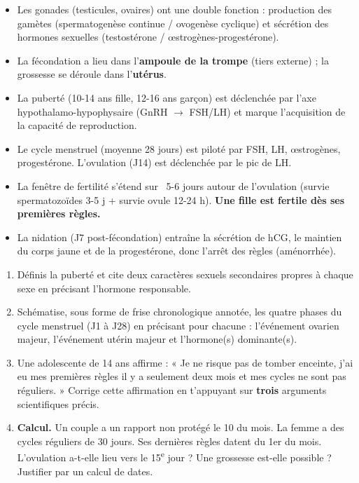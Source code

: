 \documentclass[11pt]{article}
\newcommand{\cle}[1]{{\popxbold\color{popdark}#1}}
\begin{document}
\begin{aretenir}
\begin{itemize}
\item Les \cle{gonades} (testicules, ovaires) ont une double fonction : production des gamètes (spermatogenèse continue / ovogenèse cyclique) et sécrétion des hormones sexuelles (testostérone / œstrogènes-progestérone).
\item La \cle{fécondation} a lieu dans l'\textbf{ampoule de la trompe} (tiers externe) ; la grossesse se déroule dans l'\textbf{utérus}.
\item La \cle{puberté} (10-14 ans fille, 12-16 ans garçon) est déclenchée par l'axe hypothalamo-hypophysaire (GnRH $\to$ FSH/LH) et marque l'acquisition de la capacité de reproduction.
\item Le \cle{cycle menstruel} (moyenne 28 jours) est piloté par FSH, LH, œstrogènes, progestérone. L'ovulation (J14) est déclenchée par le pic de LH.
\item La \cle{fenêtre de fertilité} s'étend sur ~5-6 jours autour de l'ovulation (survie spermatozoïdes 3-5 j + survie ovule 12-24 h). \textbf{Une fille est fertile dès ses premières règles.}
\item La \cle{nidation} (J7 post-fécondation) entraîne la sécrétion de \cle{hCG}, le maintien du corps jaune et de la progestérone, donc l'arrêt des règles (aménorrhée).
\end{itemize}
\end{aretenir}

\begin{exercice}
\begin{enumerate}
\item Définis la puberté et cite deux caractères sexuels secondaires propres à chaque sexe en précisant l'hormone responsable.
\item Schématise, sous forme de frise chronologique annotée, les quatre phases du cycle menstruel (J1 à J28) en précisant pour chacune : l'événement ovarien majeur, l'événement utérin majeur et l'hormone(s) dominante(s).
\item Une adolescente de 14 ans affirme : « Je ne risque pas de tomber enceinte, j'ai eu mes premières règles il y a seulement deux mois et mes cycles ne sont pas réguliers. » Corrige cette affirmation en t'appuyant sur \textbf{trois} arguments scientifiques précis.
\item \textbf{Calcul.} Un couple a un rapport non protégé le 10 du mois. La femme a des cycles réguliers de 30 jours. Ses dernières règles datent du 1er du mois. L'ovulation a-t-elle lieu vers le 15\textsuperscript{e} jour ? Une grossesse est-elle possible ? Justifier par un calcul de dates.
\end{enumerate}
\end{exercice}
\end{document}

